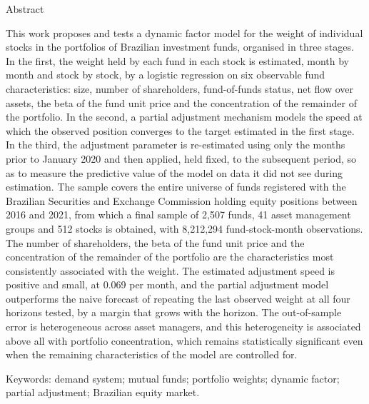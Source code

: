 \documentclass[12pt,a4paper]{article}
\begin{document}
\begin{center}{\large Abstract}\end{center}
\begin{singlespace}
\noindent
This work proposes and tests a dynamic factor model for the weight of individual stocks in
the portfolios of Brazilian investment funds, organised in three stages. In the first, the
weight held by each fund in each stock is estimated, month by month and stock by stock, by a
logistic regression on six observable fund characteristics: size, number of shareholders,
fund-of-funds status, net flow over assets, the beta of the fund unit price and the
concentration of the remainder of the portfolio. In the second, a partial adjustment
mechanism models the speed at which the observed position converges to the target estimated
in the first stage. In the third, the adjustment parameter is re-estimated using only the
months prior to January 2020 and then applied, held fixed, to the subsequent period, so as to
measure the predictive value of the model on data it did not see during estimation. The
sample covers the entire universe of funds registered with the Brazilian Securities and
Exchange Commission holding equity positions between 2016 and 2021, from which a final sample
of 2,507 funds, 41 asset management groups and 512 stocks is obtained, with 8,212,294
fund-stock-month observations. The number of shareholders, the beta of the fund unit price
and the concentration of the remainder of the portfolio are the characteristics most
consistently associated with the weight. The estimated adjustment speed is positive and
small, at 0.069 per month, and the partial adjustment model outperforms the naive forecast of
repeating the last observed weight at all four horizons tested, by a margin that grows with
the horizon. The out-of-sample error is heterogeneous across asset managers, and this
heterogeneity is associated above all with portfolio concentration, which remains
statistically significant even when the remaining characteristics of the model are
controlled for.

\smallskip

\noindent Keywords: demand system; mutual funds; portfolio weights; dynamic factor; partial
adjustment; Brazilian equity market.
\end{singlespace}

\newpage
\tableofcontents
\newpage
\pagestyle{fancy}

\end{document}

